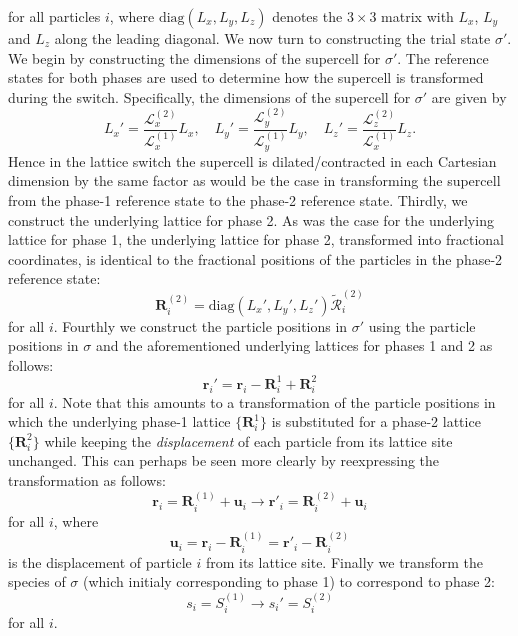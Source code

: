 \documentclass{report}
\begin{document}
for all particles $i$, where $\text{diag}(L_x,L_y,L_z)$ denotes the $3\times 3$ matrix with $L_x$, $L_y$ and $L_z$ along the leading diagonal. We now turn
to constructing the trial state $\sigma'$. We begin by constructing the dimensions of the supercell for $\sigma'$. The reference states for both phases are 
used to determine how the supercell is transformed during the switch. Specifically, the dimensions of the supercell for $\sigma'$ are given by
\begin{equation}
L_x'=\frac{\mathcal{L}_x^{(2)}}{\mathcal{L}_x^{(1)}}L_x, \quad 
L_y'=\frac{\mathcal{L}_y^{(2)}}{\mathcal{L}_y^{(1)}}L_y, \quad 
L_z'=\frac{\mathcal{L}_z^{(2)}}{\mathcal{L}_x^{(1)}}L_z.
\end{equation}
Hence in the lattice switch the supercell is dilated/contracted in each Cartesian dimension by the same factor as would be the case in transforming the
supercell from the phase-1 reference state to the phase-2 reference state.
Thirdly, we construct the underlying lattice for phase 2. As was the case for the underlying lattice for phase 1, the underlying lattice for phase
2, transformed into fractional coordinates, is identical to the fractional positions of the particles in the phase-2 reference state:
\begin{equation}
\mathbf{R}^{(2)}_i = \text{diag}(L_x',L_y',L_z')\tilde{\mathcal{R}}^{(2)}_i
\end{equation}
for all $i$.
Fourthly we construct the particle positions in $\sigma'$ using the particle positions in $\sigma$ and the aforementioned underlying lattices for
phases 1 and 2 as follows:
\begin{equation}
\mathbf{r}_i'=\mathbf{r}_i-\mathbf{R}^{1}_i+\mathbf{R}^{2}_i
\end{equation}
for all $i$. Note that this amounts to a transformation of the particle positions in which the underlying phase-1 lattice $\lbrace\mathbf{R}^{1}_i\rbrace$ 
is substituted for a phase-2 lattice $\lbrace\mathbf{R}^{2}_i\rbrace$ while keeping the \emph{displacement} of each particle from its lattice site unchanged. 
This can perhaps be seen more clearly by reexpressing the transformation as follows:
\begin{equation}
\mathbf{r}_i=\mathbf{R}^{(1)}_i+\mathbf{u}_i \to \mathbf{r}'_i=\mathbf{R}^{(2)}_i+\mathbf{u}_i
\end{equation}
for all $i$, where
\begin{equation}
\mathbf{u}_i=\mathbf{r}_i-\mathbf{R}^{(1)}_i=\mathbf{r}'_i-\mathbf{R}^{(2)}_i
\end{equation}
is the displacement of particle $i$ from its lattice site.
Finally we transform the species of $\sigma$ (which initialy corresponding to phase 1) to correspond to phase 2:
\begin{equation}
s_i= S^{(1)}_i\to s_i'= S^{(2)}_i
\end{equation}
for all $i$.
\end{document}

